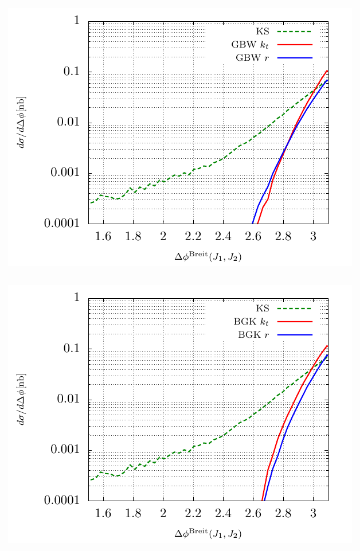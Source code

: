 \documentclass[12pt]{article}
\numberwithin{equation}{section}
\numberwithin{table}{section}
\numberwithin{figure}{section}
\begin{document}
\begin{figure}[p]
	\begin{subfigure}{0.5\textwidth}
		\includegraphics[width=\textwidth]{plots/plotGBW1Jets} 
	\end{subfigure}
	\begin{subfigure}{0.5\textwidth}
		\includegraphics[width=\textwidth]{plots/plotBGK1Jets} 
	\end{subfigure}


\end{figure}
\end{document}
